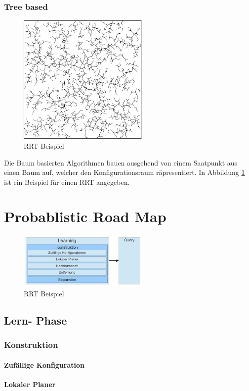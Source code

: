 \documentclass[journal]{IEEEtran}
\begin{document}
\subsubsection{Tree based}
\begin{figure}[!t]
\centering
\includegraphics[width=2.5in]{RRT}
\caption{RRT Beispiel}
\label{rrt}
\end{figure}
Die Baum basierten Algorithmen bauen ausgehend von einem Saatpunkt aus einen Baum auf, welcher den Konfigurationsraum räpresentiert. In Abbildung \ref{rrt} ist ein Beispiel für einen RRT angegeben.
\cite{tsk07}
\section{Probablistic Road Map}
\begin{figure}[!t]
\centering
\includegraphics[width=2.5in]{prm}
\caption{RRT Beispiel}
\label{prmphases}
\end{figure}
\subsection{Lern- Phase}
\subsubsection{Konstruktion}
\paragraph{Zufällige Konfiguration}
\paragraph{Lokaler Planer}
\end{document}
